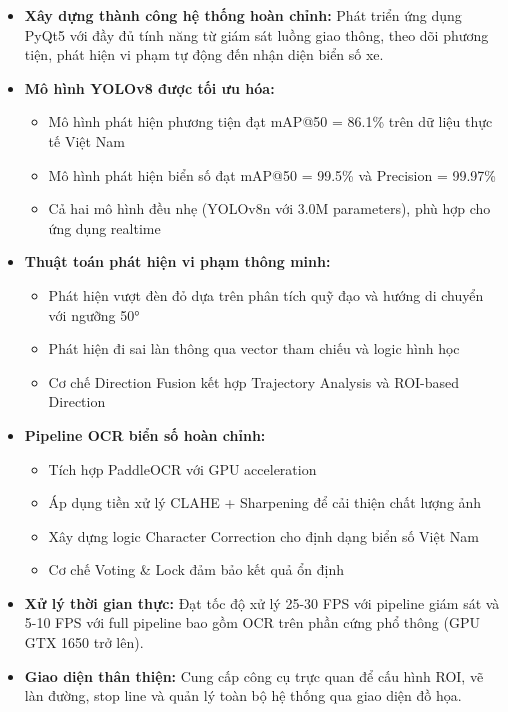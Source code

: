 \begin{itemize}
    \item \textbf{Xây dựng thành công hệ thống hoàn chỉnh:} Phát triển ứng dụng PyQt5 với đầy đủ tính năng từ giám sát luồng giao thông, theo dõi phương tiện, phát hiện vi phạm tự động đến nhận diện biển số xe.
    
    \item \textbf{Mô hình YOLOv8 được tối ưu hóa:}
    \begin{itemize}
        \item Mô hình phát hiện phương tiện đạt mAP@50 = 86.1\% trên dữ liệu thực tế Việt Nam
        \item Mô hình phát hiện biển số đạt mAP@50 = 99.5\% và Precision = 99.97\%
        \item Cả hai mô hình đều nhẹ (YOLOv8n với 3.0M parameters), phù hợp cho ứng dụng realtime
    \end{itemize}
    
    \item \textbf{Thuật toán phát hiện vi phạm thông minh:}
    \begin{itemize}
        \item Phát hiện vượt đèn đỏ dựa trên phân tích quỹ đạo và hướng di chuyển với ngưỡng 50°
        \item Phát hiện đi sai làn thông qua vector tham chiếu và logic hình học
        \item Cơ chế Direction Fusion kết hợp Trajectory Analysis và ROI-based Direction
    \end{itemize}
    
    \item \textbf{Pipeline OCR biển số hoàn chỉnh:}
    \begin{itemize}
        \item Tích hợp PaddleOCR với GPU acceleration
        \item Áp dụng tiền xử lý CLAHE + Sharpening để cải thiện chất lượng ảnh
        \item Xây dựng logic Character Correction cho định dạng biển số Việt Nam
        \item Cơ chế Voting \& Lock đảm bảo kết quả ổn định
    \end{itemize}
    
    \item \textbf{Xử lý thời gian thực:} Đạt tốc độ xử lý 25-30 FPS với pipeline giám sát và 5-10 FPS với full pipeline bao gồm OCR trên phần cứng phổ thông (GPU GTX 1650 trở lên).
    
    \item \textbf{Giao diện thân thiện:} Cung cấp công cụ trực quan để cấu hình ROI, vẽ làn đường, stop line và quản lý toàn bộ hệ thống qua giao diện đồ họa.
\end{itemize}

